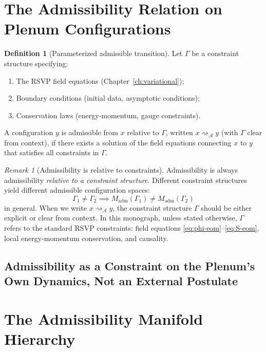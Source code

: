 \documentclass[12pt,a4paper,twoside,openright]{book}
\theoremstyle{plain}
\theoremstyle{definition}
\newtheorem{definition}[theorem]{Definition}
\theoremstyle{remark}
\newtheorem{remark}[theorem]{Remark}
\newcommand{\Adm}{\mathcal{A}}
\newcommand{\leadsR}{\rightsquigarrow_{\Adm}}
\newcommand{\Mad}{M_{\mathrm{adm}}}
\begin{document}
\section{The Admissibility Relation on Plenum Configurations}

\begin{definition}[Parameterized admissible transition]
Let $\Gamma$ be a constraint structure specifying:
\begin{enumerate}
\item The RSVP field equations (Chapter~\ref{ch:variational});
\item Boundary conditions (initial data, asymptotic conditions);
\item Conservation laws (energy-momentum, gauge constraints).
\end{enumerate}
A configuration $y$ is admissible from $x$ relative to $\Gamma$, written $x \leadsR y$ (with $\Gamma$ clear from context), if there exists a solution of the field equations connecting $x$ to $y$ that satisfies all constraints in $\Gamma$.
\end{definition}

\begin{remark}[Admissibility is relative to constraints]
Admissibility is always admissibility \emph{relative to a constraint structure}. Different constraint structures yield different admissible configuration spaces:
\[
\Gamma_1 \neq \Gamma_2 \implies \Mad(\Gamma_1) \neq \Mad(\Gamma_2)
\]
in general. When we write $x \leadsR y$, the constraint structure $\Gamma$ should be either explicit or clear from context. In this monograph, unless stated otherwise, $\Gamma$ refers to the standard RSVP constraints: field equations \eqref{eq:phi-eom}--\eqref{eq:S-eom}, local energy-momentum conservation, and causality.
\end{remark}

\subsection{Admissibility as a Constraint on the Plenum's Own Dynamics, Not an External Postulate}

\section{The Admissibility Manifold Hierarchy}

\end{document}
